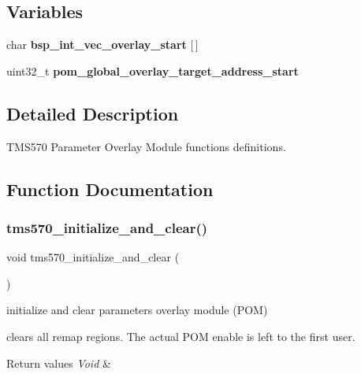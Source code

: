 \subsection*{Variables}
\begin{DoxyCompactItemize}
\item 
\mbox{\label{tms570-pom_8c_a965b160fb7522cd9e9831d4fe96d7c9c}} 
char {\bfseries bsp\+\_\+int\+\_\+vec\+\_\+overlay\+\_\+start} \mbox{[}$\,$\mbox{]}
\item 
uint32\+\_\+t {\bfseries pom\+\_\+global\+\_\+overlay\+\_\+target\+\_\+address\+\_\+start}
\end{DoxyCompactItemize}


\subsection{Detailed Description}
T\+M\+S570 Parameter Overlay Module functions definitions. 



\subsection{Function Documentation}
\mbox{\label{tms570-pom_8c_a910d08b5bfffed83b88de9eb2ab27bc5}} 
\subsubsection{\texorpdfstring{tms570\_initialize\_and\_clear()}{tms570\_initialize\_and\_clear()}}
{\footnotesize\ttfamily void tms570\+\_\+initialize\+\_\+and\+\_\+clear (\begin{DoxyParamCaption}\item[{void}]{ }\end{DoxyParamCaption})}



initialize and clear parameters overlay module (P\+OM) 

clears all remap regions. The actual P\+OM enable is left to the first user.


\begin{DoxyRetVals}{Return values}
{\em Void} & \\
\hline
\end{DoxyRetVals}
\mbox{\label{tms570-pom_8c_aa5484712012d1e84f9422450a76fd6d4}} 
